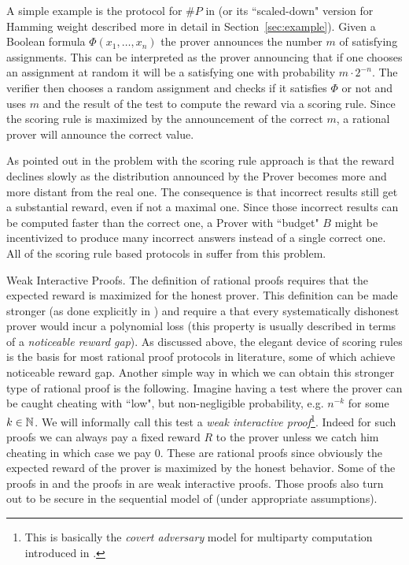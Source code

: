 A simple example is the protocol for $\#P$ in \cite{am} (or its ``scaled-down" version for Hamming weight described more in detail in Section~\ref{sec:example}). Given a Boolean formula $\Phi(x_1,\ldots,x_n)$ the prover announces the number $m$ of satisfying assignments. This can be interpreted as the prover announcing that if one chooses an assignment at random it will be a satisfying one with probability $m \cdot 2^{-n}$. The verifier then chooses a random assignment and checks if it satisfies $\Phi$ or not and uses $m$ and the result of the test to compute the reward via a scoring rule. Since the scoring rule is maximized by the announcement of the correct $m$, a rational prover will announce the correct value. 

As pointed out in \cite{cg15} the problem with the scoring rule approach is that the reward declines slowly as the distribution announced by the Prover becomes more and more distant from the real one. The consequence is that incorrect results still get a substantial reward, even if not a maximal one. Since those incorrect results can be computed faster than the correct one, a Prover with ``budget" $B$ might be incentivized to produce many incorrect answers instead of a single correct one. All of the scoring rule based protocols in \cite{am,am1,ratargs,ratsumchecks} suffer from this problem. 

\medskip
\noindent
{\sc Weak Interactive Proofs.}
The definition of rational proofs requires that the expected reward is maximized for the honest prover. This definition can be made stronger (as done explicitly in \cite{ratargs}) and require a that every systematically dishonest prover would incur a polynomial loss (this property is usually described in terms of a \textit{noticeable reward gap}). As discussed above, the elegant device of scoring rules is the basis for most rational proof protocols in literature, some of which achieve noticeable reward gap. Another simple way in which we can obtain this stronger type of rational proof is the following. Imagine having a test where the prover can be caught cheating with ``low", but non-negligible probability, e.g. $n^{-k}$ for some $k \in \mathbb{N}$.
We will informally call this test a \textit{weak interactive proof}\footnote{This is basically the {\em covert adversary} model for multiparty computation introduced in \cite{AL10}.}. Indeed for such proofs we can always pay a fixed reward $R$ to the prover unless we catch him cheating in which case we pay $0$. These are rational proofs since obviously the expected reward of the prover is maximized by the honest behavior. Some of the proofs in \cite{am} and the proofs in \cite{cg15} are weak interactive proofs. Those proofs also turn out to be secure in the sequential model of \cite{cg15} (under appropriate assumptions). 

